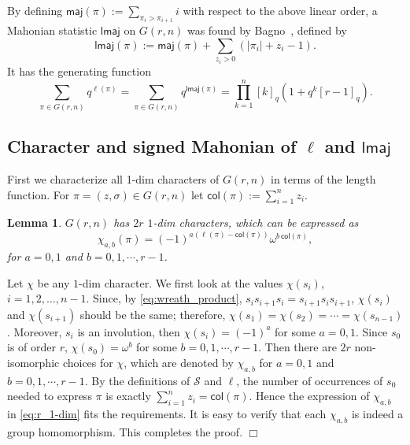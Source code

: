 \documentclass[a4paper, reqno, 11pt]{amsart}
\newtheorem{lem}{Lemma}[section]
\newcommand{\maj}{{\textsf{maj}}}
\newcommand{\lmaj}{{\textsf{lmaj}}}
\newcommand{\col}{{\textsf{col}}}
\numberwithin{equation}{section}
\def\proof{\noindent{\bf Proof.\quad}}
\def\qed{\hspace*{\fill} $\Box$ \medskip}
\begin{document}
By defining $\maj(\pi):=\sum_{\pi_i>\pi_{i+1}}i$ with respect to the above linear order, a Mahonian statistic $\lmaj$ on $G(r,n)$ was found by Bagno~\cite{Bagno_04}, defined by
\begin{equation}\label{eq:lmaj_Grn}
\lmaj(\pi):=\maj(\pi)+\sum_{z_i>0}(|\pi_i|+z_i-1).
\end{equation}
It has the generating function
\begin{equation}\label{eq:equidist_Grn}
\sum_{\pi\in G(r,n)}q^{\ell(\pi)}=\sum_{\pi\in G(r,n)}q^{\lmaj(\pi)}= \prod_{k=1}^n[k]_q(1+q^k[r-1]_q).
\end{equation}


\subsection{Character and signed Mahonian of $\ell$ and $\lmaj$}\label{sec:Grn_SM}








First we characterize all 1-dim characters of $G(r,n)$ in terms of the length function. 
For $\pi=(z,\sigma)\in G(r,n)$ let $\col(\pi):=\sum_{i=1}^n z_i$.


\begin{lem}\label{lem:1-dim}
$G(r,n)$ has $2r$ $1$-dim characters, which can be expressed as
\begin{equation}\label{eq:r_1-dim}
\chi_{a,b}(\pi)=(-1)^{a(\ell(\pi)-\col(\pi))}\omega^{b\,\col(\pi)},
\end{equation}
for $a=0,1$ and $b=0,1,\cdots, r-1$.
\end{lem}
\proof 
Let $\chi$ be any $1$-dim character. 
We first look at the values $\chi(s_i)$, $i=1,2,\ldots,n-1$.
Since, by \eqref{eq:wreath_product}, $s_i s_{i+1} s_i = s_{i+1} s_i s_{i+1}$, $\chi(s_i)$ and $\chi(s_{i+1})$ should be the same; therefore, $\chi(s_1)=\chi(s_2)=\cdots =\chi(s_{n-1})$. 
Moreover, $s_i$ is an involution, then $\chi(s_i)=(-1)^a$ for some $a=0,1$. 
Since $s_0$ is of order $r$, $\chi(s_0)=\omega^b$ for some $b=0,1,\cdots, r-1$. 
Then there are $2r$ non-isomorphic choices for $\chi$, which are denoted by $\chi_{a,b}$ for $a=0,1$ and $b=0,1,\cdots, r-1$. 
By the definitions of $\mathcal{S}$ and $\ell$, the number of occurrences of $s_0$ needed to express $\pi$ is exactly $\sum_{i=1}^n z_i=\col(\pi)$. 
Hence the expression of $\chi_{a,b}$ in \eqref{eq:r_1-dim} fits the requirements. 
It is easy to verify that each $\chi_{a,b}$ is indeed a group homomorphism. 
This completes the proof. \qed
\end{document}
